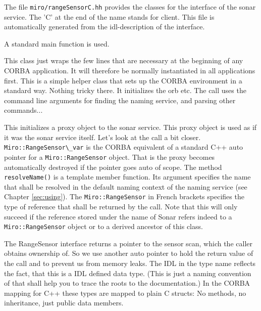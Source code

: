 The file \lstinline!miro/rangeSensorC.hh! provides the classes for the interface of the
sonar service. The 'C' at the end of the name stands for client. This
file is automatically generated from the idl-description of the interface.



A standard main function is used.



This class just wraps the few lines that are necessary at the beginning of any CORBA
application. It will therefore be normally instantiated in all \miro
applications first. This is a simple helper class that sets up the
CORBA environment in a standard way. Nothing tricky there.  It
initializes the orb etc. The call uses the command line arguments for
finding the naming service, and parsing other commands...



This initializes a proxy object to the
sonar service. This proxy object is used as if it was the sonar service
itself. Let's look at the call a bit closer. \lstinline!Miro::RangeSensor\_var!
is the CORBA equivalent of a standard C++ auto pointer for a
\lstinline!Miro::RangeSensor! object. That is the proxy becomes automatically
destroyed if the pointer goes auto of scope. The method
{\tt resolveName()} is a template member function. Its argument
specifies the name that shall be resolved in the default naming
context of the naming service (see Chapter \ref{sec:using}). The
\lstinline!Miro::RangeSensor! in French brackets specifies the type of
reference that shall be returned by the call. Note that this will only
succeed if the reference stored under the name of Sonar refers indeed
to a {\tt Miro::RangeSensor} object or to a derived ancestor of this
class.



The RangeSensor interface returns a pointer to the sensor scan, which
the caller obtains ownership of. So we use another auto pointer to
hold the return value of the call and to prevent us from memory leaks.
The IDL in the type name reflects the fact, that this is a IDL defined
data type. (This is just a naming convention of \miro that shall help
you to trace the roots to the documentation.) In the CORBA mapping for
C++ these types are mapped to plain C structs: No methods, no
inheritance, just public data members.

